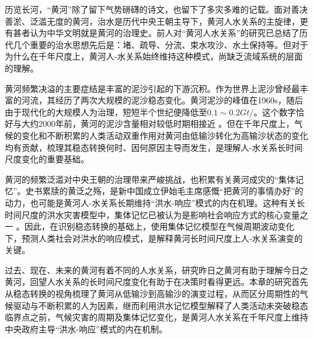 
历览长河，“黄河”除了留下气势磅礴的诗文，也留下了多灾多难的记载。面对善决善淤、泛滥无度的黄河，治水是历代中央王朝主导下，黄河人水关系的主旋律，更有甚者认为中华文明就是黄河的治理史。前人对“黄河人水关系”的研究已总结了历代几个重要的治水思想先后是：堵、疏导、分流、束水攻沙、水土保持等。但对于为什么在千年尺度上，黄河人-水关系始终维持这种模式，尚缺乏流域系统的层面的理解。

黄河频繁决溢的主要症结是丰富的泥沙引起的下游沉积。作为世界上泥沙曾经最丰富的河流，其经历了两次大规模的泥沙稳态变化\cite{wang2007, wei2016}。黄河泥沙的峰值在1960s，随后由于现代化的大规模人为治理，短短半个世纪便降低至$0.1\sim0.2 Gt/$。这个数字恰好与大约2000年前，黄河的泥沙含量相对较低时期相接近 \cite{song2020}。但在千年尺度上，气候的变化和不断积累的人类活动双重作用对黄河由低输沙转化为高输沙状态的变化均有贡献，梳理其稳态转换何时、因何原因主导而发生，是理解人-水关系长时间尺度变化的重要基础。

黄河的频繁泛滥对中央王朝的治理带来严峻挑战，也积累有关黄河成灾的“集体记忆”。史书累牍的黄泛之殇，是新中国成立伊始毛主席感慨“把黄河的事情办好”的动力，也可能是黄河人-水关系长期维持“洪水-响应”模式的内在机理。这种有关长时间尺度的洪水灾害模型中，集体记忆已被认为是影响社会响应方式的核心变量之一 \cite{dibaldassarre2015, dibaldassarre2019,ciullo2017}。因此，在识别稳态转换的基础上，使用集体记忆模型在气候周期波动变化下，预测人类社会对洪水的响应模式，是解释黄河长时间尺度上人-水关系演变的关键。

过去、现在、未来的黄河有着不同的人水关系，研究昨日之黄河有助于理解今日之黄河，回望人水关系的长时间尺度变化有助于在决策时看得更远。本章的研究首先从稳态转换的视角梳理了黄河从低输沙到高输沙的演变过程，从而区分周期性的气候驱动与不断积累的人为因素，继而利用洪水记忆模型解释了人类活动未突破稳态临界点之前，气候灾害的周期及集体记忆变化，是黄河人水关系在千年尺度上维持中央政府主导“洪水-响应”模式的内在机制。

